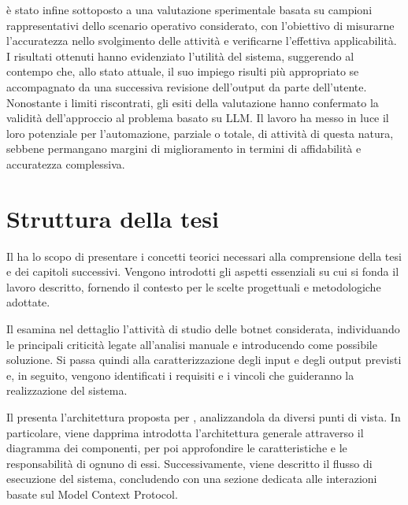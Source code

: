 \system{} è stato infine sottoposto a una valutazione sperimentale basata su campioni rappresentativi dello scenario operativo considerato, con l'obiettivo di misurarne l'accuratezza nello svolgimento delle attività e verificarne l'effettiva applicabilità. I risultati ottenuti hanno evidenziato l'utilità del sistema, suggerendo al contempo che, allo stato attuale, il suo impiego risulti più appropriato se accompagnato da una successiva revisione dell'output da parte dell'utente. Nonostante i limiti riscontrati, gli esiti della valutazione hanno confermato la validità dell'approccio al problema basato su LLM. Il lavoro ha messo in luce il loro potenziale per l'automazione, parziale o totale, di attività di questa natura, sebbene permangano margini di miglioramento in termini di affidabilità e accuratezza complessiva.


\section{Struttura della tesi} %

Il  ha lo scopo di presentare i concetti teorici necessari alla comprensione della tesi e dei capitoli successivi. Vengono introdotti gli aspetti essenziali su cui si fonda il lavoro descritto, fornendo il contesto per le scelte progettuali e metodologiche adottate.

Il  esamina nel dettaglio l'attività di studio delle botnet considerata, individuando le principali criticità legate all'analisi manuale e introducendo \system{} come possibile soluzione. Si passa quindi alla caratterizzazione degli input e degli output previsti e, in seguito, vengono identificati i requisiti e i vincoli che guideranno la realizzazione del sistema. %

Il  presenta l'architettura proposta per \system{}, analizzandola da diversi punti di vista. In particolare, viene dapprima introdotta l'architettura generale attraverso il diagramma dei componenti, per poi approfondire le caratteristiche e le responsabilità di ognuno di essi. Successivamente, viene descritto il flusso di esecuzione del sistema, concludendo con una sezione dedicata alle interazioni basate sul Model Context Protocol.

